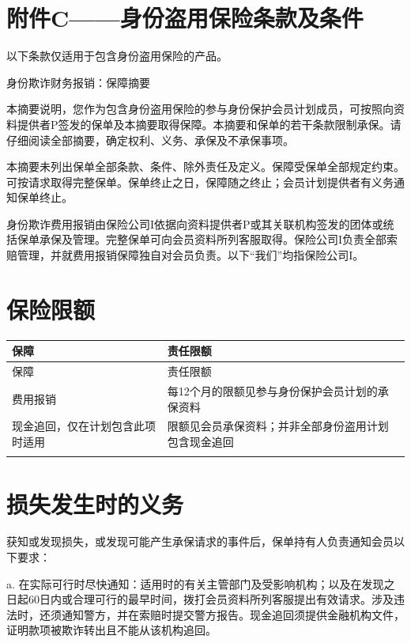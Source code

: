 \documentclass[UTF8,fontset=none,11pt,a4paper]{ctexart}
\begin{document}
\section*{附件C——身份盗用保险条款及条件}
以下条款仅适用于包含身份盗用保险的产品。


身份欺诈财务报销：保障摘要


本摘要说明，您作为包含身份盗用保险的参与身份保护会员计划成员，可按照向资料提供者P签发的保单及本摘要取得保障。本摘要和保单的若干条款限制承保。请仔细阅读全部摘要，确定权利、义务、承保及不承保事项。


本摘要未列出保单全部条款、条件、除外责任及定义。保障受保单全部规定约束。可按请求取得完整保单。保单终止之日，保障随之终止；会员计划提供者有义务通知保单终止。


身份欺诈费用报销由保险公司I依据向资料提供者P或其关联机构签发的团体或统括保单承保及管理。完整保单可向会员资料所列客服取得。保险公司I负责全部索赔管理，并就费用报销保障独自对会员负责。以下“我们”均指保险公司I。


\section*{保险限额}
\begingroup\small\setlength{\tabcolsep}{4pt}\renewcommand{\arraystretch}{1.35}
\begin{longtable}{>{\raggedright\arraybackslash}p{0.68\dimexpr\linewidth-4\tabcolsep\relax}>{\raggedright\arraybackslash}p{0.32\dimexpr\linewidth-4\tabcolsep\relax}}
\toprule
\rowcolor{TableHead} 保障 & 责任限额 \\
\midrule\endfirsthead
\toprule
\rowcolor{TableHead} 保障 & 责任限额 \\
\midrule\endhead
\midrule\endfoot
\bottomrule\endlastfoot
费用报销 & 每12个月的限额见参与身份保护会员计划的承保资料 \\ \addlinespace[3pt]
现金追回，仅在计划包含此项时适用 & 限额见会员承保资料；并非全部身份盗用计划包含现金追回 \\ \addlinespace[3pt]
\end{longtable}\endgroup
\section*{损失发生时的义务}
获知或发现损失，或发现可能产生承保请求的事件后，保单持有人负责通知会员以下要求：


a. 在实际可行时尽快通知：适用时的有关主管部门及受影响机构；以及在发现之日起60日内或合理可行的最早时间，拨打会员资料所列客服提出有效请求。涉及违法时，还须通知警方，并在索赔时提交警方报告。现金追回须提供金融机构文件，证明款项被欺诈转出且不能从该机构追回。
\end{document}
